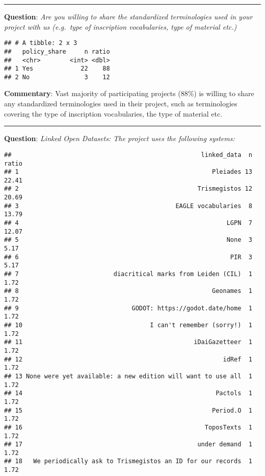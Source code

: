 \documentclass[
]{article}
\begin{document}
\begin{center}\rule{0.5\linewidth}{0.5pt}\end{center}

\textbf{Question}: \emph{Are you willing to share the standardized
terminologies used in your project with us (e.g.~type of inscription
vocabularies, type of material etc.)}

\begin{verbatim}
## # A tibble: 2 x 3
##   policy_share     n ratio
##   <chr>        <int> <dbl>
## 1 Yes             22    88
## 2 No               3    12
\end{verbatim}

\textbf{Commentary}: Vast majority of participating projects (88\%) is
willing to share any standardized terminologies used in their project,
such as terminologies covering the type of inscription vocabularies, the
type of material etc.

\begin{center}\rule{0.5\linewidth}{0.5pt}\end{center}

\textbf{Question}: \emph{Linked Open Datasets: The project uses the
following systems:}

\begin{verbatim}
##                                                    linked_data  n ratio
## 1                                                     Pleiades 13 22.41
## 2                                                 Trismegistos 12 20.69
## 3                                           EAGLE vocabularies  8 13.79
## 4                                                         LGPN  7 12.07
## 5                                                         None  3  5.17
## 6                                                          PIR  3  5.17
## 7                          diacritical marks from Leiden (CIL)  1  1.72
## 8                                                     Geonames  1  1.72
## 9                               GODOT: https://godot.date/home  1  1.72
## 10                                   I can't remember (sorry!)  1  1.72
## 11                                               iDaiGazetteer  1  1.72
## 12                                                       idRef  1  1.72
## 13 None were yet available: a new edition will want to use all  1  1.72
## 14                                                     Pactols  1  1.72
## 15                                                    Period.O  1  1.72
## 16                                                  ToposTexts  1  1.72
## 17                                                under demand  1  1.72
## 18   We periodically ask to Trismegistos an ID for our records  1  1.72
\end{verbatim}
\end{document}

